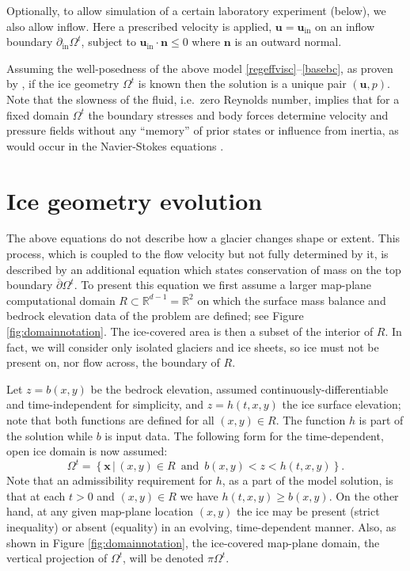 \documentclass[letterpaper,final,12pt,reqno]{amsart}
\newcommand{\RR}{\mathbb{R}}
\newcommand{\bn}{\mathbf{n}}
\newcommand{\bu}{\mathbf{u}}
\newcommand{\bx}{\mathbf{x}}
\begin{document}
Optionally, to allow simulation of a certain laboratory experiment \cite{SayagWorster2013} (below), we also allow inflow.  Here a prescribed velocity is applied, $\bu = \bu_{\text{in}}$ on an inflow boundary $\partial_{\text{in}} \Omega^t$, subject to $\bu_{\text{in}}\cdot \bn \le 0$ where $\bn$ is an outward normal.

Assuming the well-posedness of the above model \eqref{regeffvisc}--\eqref{basebc}, as proven by \cite{JouvetRappaz2011}, if the ice geometry $\Omega^t$ is known then the solution is a unique pair $(\bu,p)$.  Note that the slowness of the fluid, i.e.~zero Reynolds number, implies that for a fixed domain $\Omega^t$ the boundary stresses and body forces determine velocity and pressure fields without any ``memory'' of prior states or influence from inertia, as would occur in the Navier-Stokes equations \cite{Fowler1997}.


\section{Ice geometry evolution} \label{sec:stronggeometry}

The above equations do not describe how a glacier changes shape or extent.  This process, which is coupled to the flow velocity but not fully determined by it, is described by an additional equation which states conservation of mass on the top boundary $\overline{\partial} \Omega^t$.  To present this equation we first assume a larger map-plane computational domain $R\subset \RR^{d-1}=\RR^2$ on which the surface mass balance and bedrock elevation data of the problem are defined; see Figure \ref{fig:domainnotation}.  The ice-covered area is then a subset of the interior of $R$.  In fact, we will consider only isolated glaciers and ice sheets, so ice must not be present on, nor flow across, the boundary of $R$.

Let $z=b(x,y)$ be the bedrock elevation, assumed continuously-differentiable and time-independent for simplicity, and $z=h(t,x,y)$ the ice surface elevation; note that both functions are defined for all $(x,y)\in R$.  The function $h$ is part of the solution while $b$ is input data.  The following form for the time-dependent, open ice domain is now assumed:
\begin{equation}
\Omega^t = \left\{\bx\,\big|\,(x,y)\in R \,\text{ and }\, b(x,y) < z < h(t,x,y)\right\}.  \label{Omegat}
\end{equation}
Note that an admissibility requirement for $h$, as a part of the model solution, is that at each $t>0$ and $(x,y)\in R$ we have $h(t,x,y) \ge b(x,y)$.  On the other hand, at any given map-plane location $(x,y)$ the ice may be present (strict inequality) or absent (equality) in an evolving, time-dependent manner.  Also, as shown in Figure \ref{fig:domainnotation}, the ice-covered map-plane domain, the vertical projection of $\Omega^t$, will be denoted $\pi \Omega^t$.
\end{document}
